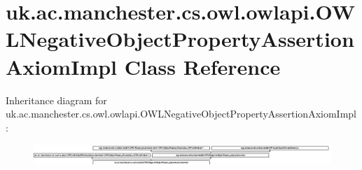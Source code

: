 \hypertarget{classuk_1_1ac_1_1manchester_1_1cs_1_1owl_1_1owlapi_1_1_o_w_l_negative_object_property_assertion_axiom_impl}{\section{uk.\-ac.\-manchester.\-cs.\-owl.\-owlapi.\-O\-W\-L\-Negative\-Object\-Property\-Assertion\-Axiom\-Impl Class Reference}
\label{classuk_1_1ac_1_1manchester_1_1cs_1_1owl_1_1owlapi_1_1_o_w_l_negative_object_property_assertion_axiom_impl}
}
Inheritance diagram for uk.\-ac.\-manchester.\-cs.\-owl.\-owlapi.\-O\-W\-L\-Negative\-Object\-Property\-Assertion\-Axiom\-Impl\-:\begin{figure}[H]
\begin{center}
\leavevmode
\includegraphics[height=0.785414cm]{classuk_1_1ac_1_1manchester_1_1cs_1_1owl_1_1owlapi_1_1_o_w_l_negative_object_property_assertion_axiom_impl}
\end{center}
\end{figure}
